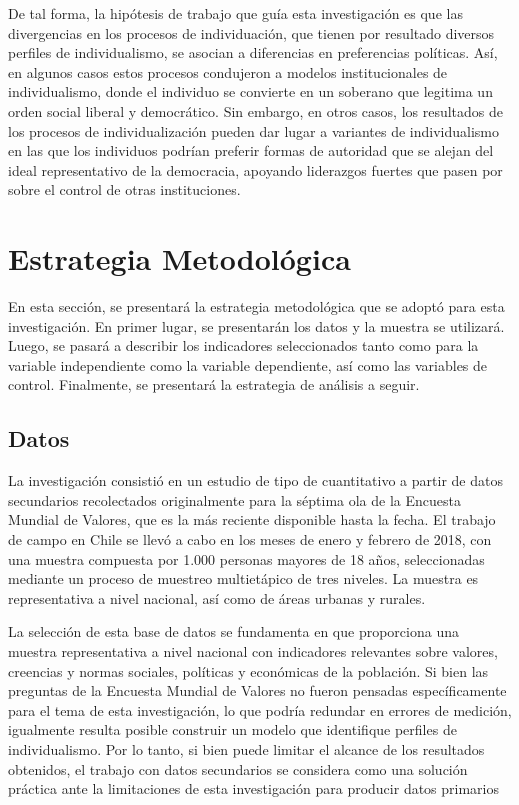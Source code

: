 \documentclass[12pt,twoside]{templates/facsothesis}
\begin{document}
De tal forma, la hipótesis de trabajo que guía esta investigación es que las divergencias en los procesos de individuación, que tienen por resultado diversos perfiles de individualismo, se asocian a diferencias en preferencias políticas. Así, en algunos casos estos procesos condujeron a modelos institucionales de individualismo, donde el individuo se convierte en un soberano que legitima un orden social liberal y democrático. Sin embargo, en otros casos, los resultados de los procesos de individualización pueden dar lugar a variantes de individualismo en las que los individuos podrían preferir formas de autoridad que se alejan del ideal representativo de la democracia, apoyando liderazgos fuertes que pasen por sobre el control de otras instituciones.

\hypertarget{estrategia-metodoluxf3gica}{%
\chapter{Estrategia Metodológica}\label{estrategia-metodoluxf3gica}}

En esta sección, se presentará la estrategia metodológica que se adoptó para esta investigación. En primer lugar, se presentarán los datos y la muestra se utilizará. Luego, se pasará a describir los indicadores seleccionados tanto como para la variable independiente como la variable dependiente, así como las variables de control. Finalmente, se presentará la estrategia de análisis a seguir.

\hypertarget{datos}{%
\section{Datos}\label{datos}}

La investigación consistió en un estudio de tipo de cuantitativo a partir de datos secundarios recolectados originalmente para la séptima ola de la Encuesta Mundial de Valores, que es la más reciente disponible hasta la fecha. El trabajo de campo en Chile se llevó a cabo en los meses de enero y febrero de 2018, con una muestra compuesta por 1.000 personas mayores de 18 años, seleccionadas mediante un proceso de muestreo multietápico de tres niveles. La muestra es representativa a nivel nacional, así como de áreas urbanas y rurales.

La selección de esta base de datos se fundamenta en que proporciona una muestra representativa a nivel nacional con indicadores relevantes sobre valores, creencias y normas sociales, políticas y económicas de la población. Si bien las preguntas de la Encuesta Mundial de Valores no fueron pensadas específicamente para el tema de esta investigación, lo que podría redundar en errores de medición, igualmente resulta posible construir un modelo que identifique perfiles de individualismo. Por lo tanto, si bien puede limitar el alcance de los resultados obtenidos, el trabajo con datos secundarios se considera como una solución práctica ante la limitaciones de esta investigación para producir datos primarios
\end{document}
